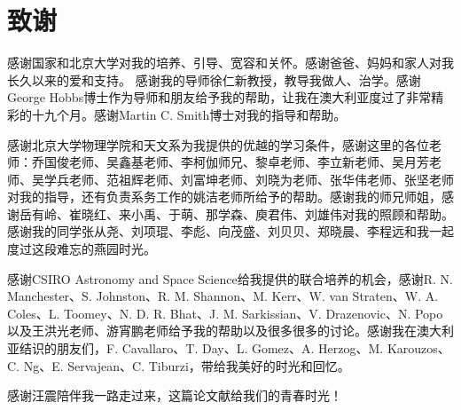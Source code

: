 
\chapter{致谢}

感谢国家和北京大学对我的培养、引导、宽容和关怀。感谢爸爸、妈妈和家人对我长久以来的爱和支持。
感谢我的导师徐仁新教授，教导我做人、治学。感谢George Hobbs博士作为导师和朋友给予我的帮助，让我在澳大利亚度过了非常精彩的十九个月。感谢Martin C. Smith博士对我的指导和帮助。

感谢北京大学物理学院和天文系为我提供的优越的学习条件，感谢这里的各位老师：乔国俊老师、吴鑫基老师、李柯伽师兄、黎卓老师、李立新老师、吴月芳老师、吴学兵老师、范祖辉老师、刘富坤老师、刘晓为老师、张华伟老师、张坚老师对我的指导，还有负责系务工作的姚洁老师所给予的帮助。感谢我的师兄师姐，感谢岳有岭、崔晓红、来小禹、于萌、那学森、庾君伟、刘雄伟对我的照顾和帮助。感谢我的同学张从尧、刘项琨、李彪、向茂盛、刘贝贝、郑晓晨、李程远和我一起度过这段难忘的燕园时光。

感谢CSIRO Astronomy and Space Science给我提供的联合培养的机会，感谢R. N. Manchester、S. Johnston、R. M. Shannon、M. Kerr、W. van Straten、W. A. Coles、L. Toomey、N. D. R. Bhat、J. M. Sarkissian、V. Drazenovic、N. Popo以及王洪光老师、游宵鹏老师给予我的帮助以及很多很多的讨论。感谢我在澳大利亚结识的朋友们，F. Cavallaro、T. Day、L. Gomez、A. Herzog、M. Karouzos、C. Ng、E. Servajean、C. Tiburzi，带给我美好的时光和回忆。

感谢汪震陪伴我一路走过来，这篇论文献给我们的青春时光！

%
%

\pkuthssffaq

